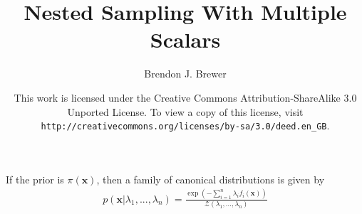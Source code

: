 \documentclass[a4paper, 11pt]{article}
\title{Nested Sampling With Multiple Scalars}
\author{Brendon J. Brewer}
\date{\vspace{3cm}This work is licensed under the Creative Commons Attribution-ShareAlike 3.0 Unported License. To view a copy of this license, visit {\tt http://creativecommons.org/licenses/by-sa/3.0/deed.en\_GB}.}
\begin{document}
\maketitle

If the prior is $\pi(\mathbf{x})$, then a family of canonical distributions
is given by
\begin{eqnarray}
p(\mathbf{x} | \lambda_1, ..., \lambda_n) = 
\frac{\exp(-\sum_{i=1}^n \lambda_i f_i(\mathbf{x}))}
{\mathcal{Z}(\lambda_1, ..., \lambda_n)}
\end{eqnarray}
\end{document}
